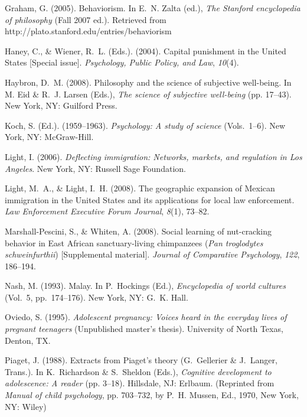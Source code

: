 \documentclass[]{interact}
\theoremstyle{plain}%
\theoremstyle{definition}
\theoremstyle{remark}
\begin{document}
\begin{thebibliography}{}
Graham, G. (2005). Behaviorism. In E.~N. Zalta (ed.), \emph{The Stanford
 encyclopedia of philosophy} (Fall 2007 ed.). Retrieved from
 http://plato.stanford.edu/entries/behaviorism

Haney, C., \& Wiener, R.~L. (Eds.). (2004). Capital punishment in the United
 States [Special issue]. \emph{Psychology, Public Policy, and Law},
 \emph{10}(4).

Haybron, D.~M. (2008). Philosophy and the science of subjective well-being. In
 M. Eid \& R.~J. Larsen (Eds.), \emph{The science of subjective well-being}
 (pp. 17--43). New York, NY: Guilford Press.

Koch, S. (Ed.). (1959--1963). \emph{Psychology: A study of science}
 (Vols.~1--6). New York, NY: McGraw-Hill.

Light, I. (2006). \emph{Deflecting immigration: Networks, markets, and
 regulation in Los Angeles}. New York, NY: Russell Sage Foundation.

Light, M.~A., \& Light, I.~H. (2008). The geographic expansion of Mexican
 immigration in the United States and its applications for local law
 enforcement. \emph{Law Enforcement Executive Forum Journal}, \emph{8}(1),
 73--82.

Marshall-Pescini, S., \& Whiten, A. (2008). Social learning of nut-cracking
 behavior in East African sanctuary-living chimpanzees (\emph{Pan troglodytes
 schweinfurthii}) [Supplemental material]. \emph{Journal of Comparative
 Psychology}, \emph{122}, 186--194.

Nash, M. (1993). Malay. In P.~Hockings (Ed.), \emph{Encyclopedia of world
 cultures} (Vol.~5, pp.~174--176). New York, NY: G.~K. Hall.

Oviedo, S. (1995). \emph{Adolescent pregnancy: Voices heard in the everyday
 lives of pregnant teenagers} (Unpublished master's thesis). University of
 North Texas, Denton, TX.

Piaget, J. (1988). Extracts from Piaget's theory (G.~Gellerier \& J.~Langer,
 Trans.). In K.~Richardson \& S.~Sheldon (Eds.), \emph{Cognitive development
 to adolescence: A reader} (pp. 3--18). Hillsdale, NJ: Erlbaum. (Reprinted
 from \emph{Manual of child psychology}, pp. 703--732, by P.~H. Mussen, Ed.,
 1970, New York, NY: Wiley)


\end{thebibliography}
\end{document}
